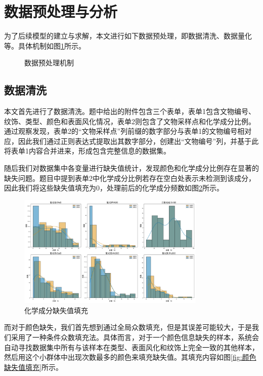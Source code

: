 
\section{数据预处理与分析}

为了后续模型的建立与求解，本文进行如下数据预处理，即数据清洗、数据量化等。具体机制如图\ref{fig:数据预处理机制}所示。

\begin{figure}[htbp]
	\centering
	\caption{数据预处理机制}
	\label{fig:数据预处理机制}
\end{figure}

\subsection{数据清洗}

本文首先进行了数据清洗。题中给出的附件包含三个表单，表单1包含文物编号、纹饰、类型、颜色和表面风化情况，表单2则包含了文物采样点和化学成分比例。通过观察发现，表单2的“文物采样点”列前缀的数字部分与表单1的文物编号相对应，因此我们通过正则表达式提取出其数字部分，创建出“文物编号”列，并基于此将表单1内容合并进来，形成包含完整信息的数据集。

随后我们对数据集中各变量进行缺失值统计，发现颜色和化学成分比例存在显著的缺失问题。题目中提到表单2中化学成分比例若存在空白处表示未检测到该成分，因此我们将这些缺失值填充为0，处理前后的化学成分频数如图\ref{fig:缺失值填充}所示。

\begin{figure}[htbp]
	\centering
	\includegraphics[width=0.8\textwidth]{figs/2模型准备/化学成分缺失值填充.png}
	\caption{化学成分缺失值填充}
	\label{fig:缺失值填充}
\end{figure}

而对于颜色缺失，我们首先想到通过全局众数填充，但是其误差可能较大，于是我们采用了一种条件众数填充法。具体而言，对于一个颜色信息缺失的样本，系统会自动寻找数据集中所有与该样本在类型、表面风化和纹饰上完全一致的其他样本，然后用这个小群体中出现次数最多的颜色来填充缺失值。其填充内容如图\ref{fig:颜色缺失值填充}所示。

